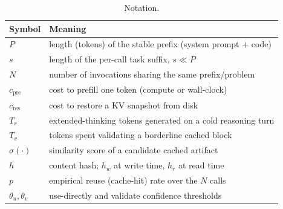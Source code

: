\documentclass[10pt]{article}
\begin{document}
\begin{table}[t]
\centering
\caption{Notation.}
\label{tab:notation}
\footnotesize
\begin{tabular}{@{}l>{\raggedright\arraybackslash}p{}@{}}
\toprule
\textbf{Symbol} & \textbf{Meaning} \\
\midrule
$P$ & length (tokens) of the stable prefix (system prompt $+$ code) \\
$s$ & length of the per-call task suffix, $s \ll P$ \\
$N$ & number of invocations sharing the same prefix/problem \\
$c_{\text{pre}}$ & cost to prefill one token (compute or wall-clock) \\
$c_{\text{res}}$ & cost to restore a KV snapshot from disk \\
$T_r$ & extended-thinking tokens generated on a cold reasoning turn \\
$T_v$ & tokens spent validating a borderline cached block \\
$\sigma(\cdot)$ & similarity score of a candidate cached artifact \\
$h$ & content hash; $h_w$ at write time, $h_r$ at read time \\
$p$ & empirical reuse (cache-hit) rate over the $N$ calls \\
$\theta_u,\theta_v$ & use-directly and validate confidence thresholds \\
\bottomrule
\end{tabular}
\end{table}
\end{document}
